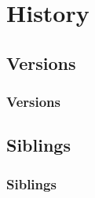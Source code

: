 \section{History}
\subsection{Versions}

\begin{frame}
	\frametitle{Versions}
\end{frame}

\subsection{Siblings}

\begin{frame}
	\frametitle{Siblings}
\end{frame}
